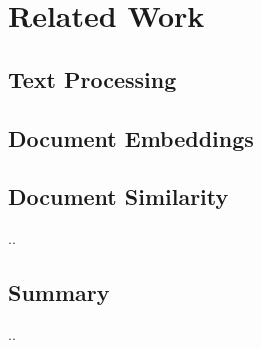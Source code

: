 

\chapter{Related Work}\label{ch:soa}

\graphicspath{{soa/figures/}}



\section{Text Processing}


\section{Document Embeddings}




\section{Document Similarity}
..


\section{Summary}
..
